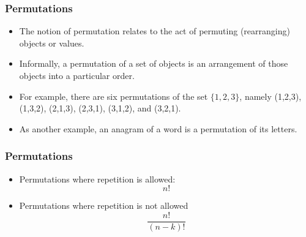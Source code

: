 \documentclass{beamer}
\begin{document}
\begin{frame}
\frametitle{Permutations}
\Large
\begin{itemize}
\item The notion of permutation relates to the act of permuting (rearranging) objects or values. 
\item Informally, a permutation of a set of objects is an arrangement of those objects into a particular order. 

\item For example, there are six permutations of the set $\{1,2,3\}$, namely (1,2,3), (1,3,2), (2,1,3), (2,3,1), (3,1,2), and (3,2,1). 
\item As another example, an anagram of a word is a permutation of its letters. 

\end{itemize}

\end{frame}
\begin{frame}
\frametitle{Permutations}
\Large
\begin{itemize}
\item Permutations where repetition is allowed: 
\[ n! \]
\item Permutations where repetition is not allowed
\[ \frac{n!}{(n-k)!} \]
\end{itemize}

\end{frame}
\end{document}
